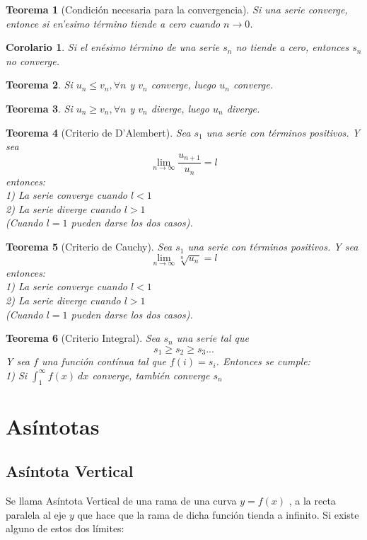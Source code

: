 \documentclass[12pt,a4paper]{extarticle}
\newtheorem{theorem}{Teorema}[section]
\newtheorem{corol}{Corolario}[theorem]
\newcommand{\limi}[4]{
  \lim_{#1 \to #2} #3 = #4
}
\begin{document}
\begin{theorem}[Condici\'on necesaria para la convergencia]
Si una serie converge, entonce si en'esimo t\'ermino tiende a cero
cuando \(n \to 0\).
\end{theorem}
\begin{corol}
Si el en\'esimo t\'ermino de una serie \(s_n\) no tiende a cero,
entonces \(s_n\) no converge.
\end{corol}
\vspace{1em}
\begin{theorem}
Si \(u_n \leq v_n, \forall n\) y \(v_n\) converge, luego \(u_n\) converge.
\end{theorem}
\begin{theorem}
Si \(u_n \geq v_n,  \forall n\) y \(v_n\) diverge, luego \(u_n\) diverge.
\end{theorem}
\begin{theorem}[Criterio de D'Alembert]
Sea \(s_1\) una serie con t\'erminos positivos. Y sea \[
\limi{n}{\infty}{\frac{u_{n+1}}{u_n}}{l} \]
entonces:\\
1) La serie converge cuando \(l < 1\)\\
2) La serie diverge cuando \(l > 1\)\\
(Cuando \(l = 1\) pueden darse los dos casos).
\end{theorem}
\begin{theorem}[Criterio de Cauchy]
Sea \(s_1\) una serie con t\'erminos positivos. Y sea \[
\limi{n}{\infty}{\sqrt[n]{u_n}}{l}\]
entonces:\\
1) La serie converge cuando \(l < 1\)\\
2) La serie diverge cuando \(l > 1\)\\
(Cuando \(l = 1\) pueden darse los dos casos).
\end{theorem}
\begin{theorem}[Criterio Integral]
Sea \(s_n\) una serie tal que
\[
s_1 \geq s_2 \geq s_3 ...
\]
Y sea \(f \) una funci\'on cont\'inua tal que \( f(i) = s_i \). Entonces se
cumple:\\
1) Si \( \int_1^{\infty} f(x) \ dx \) converge, tambi\'en converge \(s_n\)
\end{theorem}


\section{As\'intotas}

\subsection{As\'intota Vertical}
Se llama As\'intota Vertical de una rama de una curva \( y = f(x) \) , a la recta paralela al eje \( y \)  que hace que la rama de dicha funci\'on tienda a infinito. Si existe alguno de estos dos l\'imites:
\end{document}
